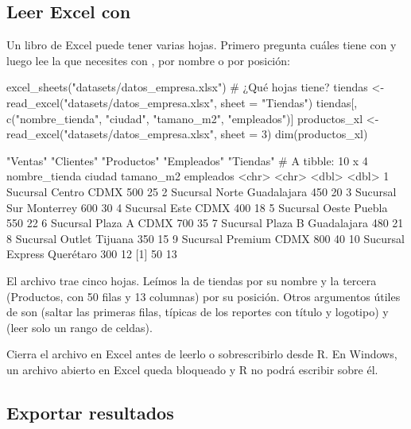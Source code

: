 \subsection{Leer Excel con \texorpdfstring{}{readxl}}

Un libro de Excel puede tener varias hojas. Primero pregunta cuáles tiene
con  y luego lee la que necesites con
, por nombre o por posición:

\begin{rcode}
excel_sheets("datasets/datos_empresa.xlsx")      # ¿Qué hojas tiene?
tiendas <- read_excel("datasets/datos_empresa.xlsx", sheet = "Tiendas")
tiendas[, c("nombre_tienda", "ciudad", "tamano_m2", "empleados")]
productos_xl <- read_excel("datasets/datos_empresa.xlsx", sheet = 3)
dim(productos_xl)
\end{rcode}
\begin{rsalida}
[1] "Ventas"    "Clientes"  "Productos" "Empleados" "Tiendas"  
# A tibble: 10 x 4
   nombre_tienda    ciudad      tamano_m2 empleados
   <chr>            <chr>           <dbl>     <dbl>
 1 Sucursal Centro  CDMX              500        25
 2 Sucursal Norte   Guadalajara       450        20
 3 Sucursal Sur     Monterrey         600        30
 4 Sucursal Este    CDMX              400        18
 5 Sucursal Oeste   Puebla            550        22
 6 Sucursal Plaza A CDMX              700        35
 7 Sucursal Plaza B Guadalajara       480        21
 8 Sucursal Outlet  Tijuana           350        15
 9 Sucursal Premium CDMX              800        40
10 Sucursal Express Querétaro         300        12
[1] 50 13
\end{rsalida}

El archivo trae cinco hojas. Leímos la de tiendas por su nombre y la
tercera (Productos, con 50 filas y 13 columnas) por su posición. Otros
argumentos útiles de  son  (saltar
las primeras filas, típicas de los reportes con título y logotipo) y
 (leer solo un rango de celdas).

\begin{advertencia}
Cierra el archivo en Excel antes de leerlo o sobrescribirlo desde R. En
Windows, un archivo abierto en Excel queda bloqueado y R no podrá
escribir sobre él.
\end{advertencia}

\subsection{Exportar resultados}


